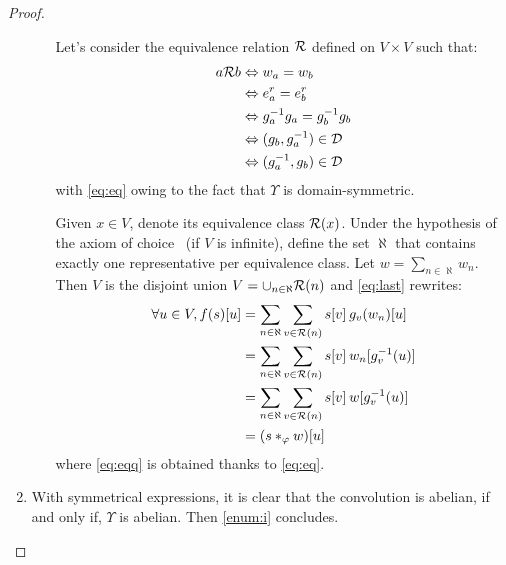 \begin{proof}
\begin{enumerate}[label=(\roman*)]
\begin{enumerate}
    Let's consider the equivalence relation $\ccr$ defined on $V \times V$ such that:
    \begin{align}
    a \ccr b & \Leftrightarrow    w_a = w_b\nonumber\\
            & \Leftrightarrow e^r_a = e^r_b\nonumber\\
            & \Leftrightarrow g_a^{-1}g_a = g_b^{-1}g_b\nonumber\\
            & \Leftrightarrow (g_b, g_a^{-1}) \in \cd\nonumber\\
            & \Leftrightarrow (g_a^{-1}, g_b) \in \cd \label{eq:eq}
    \end{align}
    with \eqref{eq:eq} owing to the fact that $\Upsilon$ is domain-symmetric.

    Given $x\in V$, denote its equivalence class $\ccr(x)$. Under the hypothesis of the axiom of choice~\citep{zermelo1904beweis} (if $V$ is infinite), define the set $\aleph$ that contains exactly one representative per equivalence class. Let $w = \sum_{n \in \aleph} w_n$. Then $V$ is the disjoint union $V = \displaystyle\cup_{n \in \aleph} \ccr(n)$ and \eqref{eq:last} rewrites:
    \begin{align}
    \forall u \in V, f(s)[u] & = \displaystyle\sum_{n \in \aleph}\sum_{v \in \ccr(n)} s[v] \h{2} g_v(w_n)[u]\nonumber\\
    	 				  & = \displaystyle\sum_{n \in \aleph}\sum_{v \in \ccr(n)} s[v] \h{2} w_n[g_v^{-1}(u)]\nonumber\\
    	 				  & = \displaystyle\sum_{n \in \aleph}\sum_{v \in \ccr(n)} s[v] \h{2} w[g_v^{-1}(u)]\label{eq:eqq}\\
    	 				  & = (s \ast_\varphi w)[u]\nonumber
    \end{align}
    where \eqref{eq:eqq} is obtained thanks to \eqref{eq:eq}.
  \end{enumerate}

  \item With symmetrical expressions, it is clear that the convolution is abelian, if and only if, $\Upsilon$ is abelian. Then \ref{enum:i} concludes.
\end{enumerate}
\end{proof}



